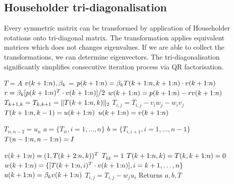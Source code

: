 \begin{refsection}
\subsection{Householder tri-diagonalisation}
\label{subsec:housetridig}

Every symmetric matrix can be transformed by application of Householder
rotations onto tri-diagonal matrix. The transformation applies equivalent
matrices which does not changes eigenvalues. If we are able to collect
the transformations, we can determine eigenvectors. The tri-diagonalisation
significantly simplifies consecutive iteration process via QR factorisation.


\begin{algorithm}
  \caption{Householder tri-diagonalisation}
  \label{alg:housetridig}
  \begin{algorithmic}
    \State {}
    \State {}
    \State $T=A$
    \State $v(k+1{:}n), \beta_k$ = 
    \State $p(k+1{:}n) = \beta_k T(k+1{:}n,k+1{:}n) \cdot v(k+1{:}n)$
    \State $r = \beta_k [p(k+1{:}n)^T \cdot v(k+1{:}n)] / 2$
    \State $w(k+1{:}n) = p(k+1{:}n) - r v(k+1{:}n)$
    \State $T_{k+1,k} = T_{k,k+1} = \lVert T(k+1{:}n,k) \rVert_2$
    \State $T_{i,j} = T_{i,j} - v_i w_j - w_i v_j$
    \EndFor
    \State $T(k+1{:}n,k-1) = u(k+1{:}n)$
    \EndIf
    \State $u(k+1{:}n) = v(k+1{:}n)$
    \EndFor

    \State $T_{n,n-2} = u_n$
    \EndIf
    \State $a = \{ T_{ii}, i = 1, \ldots, n \}$
    \State $b = \{ T_{i,i+1}, i = 1, \ldots, n-1 \}$
    \State $T(n-1{:}n,n-1{:}n) = I$

    \State $v(k+1{:}n) = (1, T(k+2{:}n,k))^T$
    \State $T_{kk} = 1$
    \State $T(k+1{:}n, k) = T(k,k+1{:}n) = 0$
    \State $w(k+1{:}n) = \{ [T(k+1{:}n,i)^T \cdot v(k+1{:}n)] , i = k+1, \ldots, n \}$
    \State $u(k+1{:}n) = \beta_k v(k+1{:}n)$
    \State $T_{i,j} = T_{i,j} - w_j u_i$
    \EndFor
    \EndFor
    \State Returns $a,b,T$
    \EndFunction
  \end{algorithmic}
\end{algorithm}


\end{refsection}
